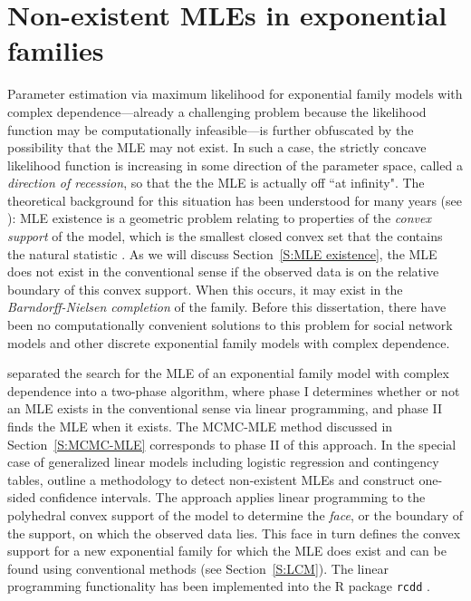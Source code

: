 \section{Non-existent MLEs in exponential families} \label{S:Non-existent MLE}
Parameter estimation via maximum likelihood for exponential family models with 
complex dependence---already a 
challenging problem because the likelihood function may be computationally 
infeasible---is further obfuscated by the possibility that the MLE
may not exist.  
In such a case, the strictly concave likelihood function is
increasing in some direction of the parameter space, called a 
\emph{direction of recession}, so that the the MLE is actually off ``at infinity".
The theoretical background 
for this situation has been understood for many years 
(see \citep{Barndorff,Brown:1986}): MLE existence is a
geometric problem relating to properties of the \emph{convex support} of the model,
which is  the smallest closed convex set 
that the contains the natural statistic \citep{Geyer:gdor}.  
As we will discuss Section~\ref{S:MLE existence}, the MLE does not exist
in the conventional sense if the observed data is on the relative boundary of this 
convex support.  When this occurs, 
it may exist in the \emph{Barndorff-Nielsen completion} of the family.
Before this dissertation, there have been no 
computationally convenient solutions to this problem for social network models
and other discrete exponential family models with complex dependence.

\citet{Geyer:1992} separated the search for the MLE of an exponential family model
with complex dependence into a two-phase algorithm, 
where phase I determines whether or not an MLE exists in the conventional 
sense via linear programming, and phase II finds the MLE when it exists.
The MCMC-MLE method discussed in Section~\ref{S:MCMC-MLE} corresponds to phase II of
this approach.
In the special case of generalized linear models including logistic regression and contingency 
tables, \citet{Geyer:gdor} outline a methodology to detect non-existent MLEs and construct 
one-sided confidence intervals.
The approach applies linear programming to the polyhedral convex support of 
the model to determine the \emph{face}, or the boundary of the support, 
on which the observed data lies.  
This face in turn defines the convex support for a new exponential family for which the MLE 
does exist and can be found using conventional methods (see Section~\ref{S:LCM}).
The linear programming 
functionality has been implemented into the R package \texttt{rcdd} \citep*{rcdd:R}.

